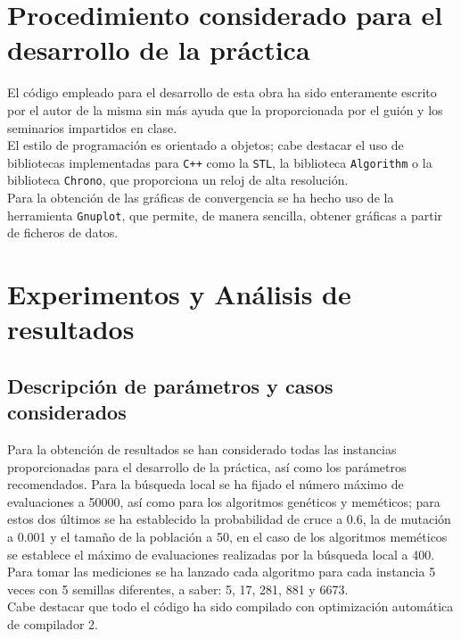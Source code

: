 \documentclass[11pt,a4paper]{article}
\begin{document}
\section{Procedimiento considerado para el desarrollo de la práctica}

	\noindent El código empleado para el desarrollo de esta obra ha sido enteramente escrito por el autor de la misma sin más ayuda que la proporcionada por el guión y los seminarios impartidos en clase.\\
	
	\noindent El estilo de programación es orientado a objetos; cabe destacar el uso de bibliotecas implementadas para \texttt{C++} como la \texttt{STL}, la biblioteca \texttt{Algorithm} o la biblioteca \texttt{Chrono}, que proporciona un reloj de alta resolución.\\
	
	\noindent Para la obtención de las gráficas de convergencia se ha hecho uso de la herramienta \texttt{Gnuplot}, que permite, de manera sencilla, obtener gráficas a partir de ficheros de datos.
	
		
\section{Experimentos y Análisis de resultados}

	\subsection{Descripción de parámetros y casos considerados}
	
		\noindent Para la obtención de resultados se han considerado todas las instancias proporcionadas para el desarrollo de la práctica, así como los parámetros recomendados. Para la búsqueda local se ha fijado el número máximo de evaluaciones a 50000, así como para los algoritmos genéticos y meméticos; para estos dos últimos se ha establecido la  probabilidad de cruce a 0.6, la de mutación a 0.001 y el tamaño de la población a 50, en el caso de los algoritmos meméticos se establece el máximo de evaluaciones realizadas por la búsqueda local a 400.\\
		
		\noindent Para tomar las mediciones se ha lanzado cada algoritmo para cada instancia 5 veces con 5 semillas diferentes, a saber: 5, 17, 281, 881 y 6673.\\
		
		\noindent Cabe destacar que todo el código ha sido compilado con optimización automática de compilador 2.
	
\end{document}

